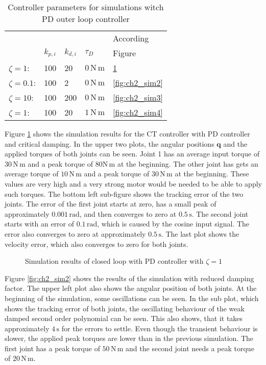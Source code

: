 \begin{table}[H]
	\begin{center}
		\caption{Controller parameters for simulations witch PD outer loop controller}
		\label{tab:ch2_pdparams}
		\begin{tabular}{lllll}
			 & & & & According \\
			 & $k_{p,i}$ & $k_{d,i}$ & $\tau_D$ & Figure \\
			\midrule
			$\zeta = 1$: & 100 & 20 & $0\,\mathrm{N\,m}$ & \ref{fig:ch2_sim1} \\
			$\zeta = 0.1$: & 100 & 2 & $0\,\mathrm{N\,m}$ & \ref{fig:ch2_sim2} \\
			$\zeta = 10$: & 100 & 200 & $0\,\mathrm{N\,m}$ & \ref{fig:ch2_sim3} \\
			$\zeta = 1$: & 100 & 20 & $1\,\mathrm{N\,m}$ & \ref{fig:ch2_sim4} \\
			\bottomrule
		\end{tabular}
	\end{center}
\end{table}
Figure \ref{fig:ch2_sim1} shows the simulation results for the \ac{CT} controller with PD controller and critical damping. In the upper two plots, the angular positions $\mathbf{q}$ and the applied torques of both joints can be seen. Joint 1 has an average input torque of $30\,\mathrm{N\,m}$ and a peak torque of $80\mathrm{N\,m}$ at the beginning. The other joint has gets an average torque of $10\,\mathrm{N\,m}$ and a peak torque of $30\,\mathrm{N\,m}$ at the beginning. These values are very high and a very strong motor would be needed to be able to apply such torques. The bottom left sub-figure shows the tracking error of the two joints. The error of the first joint starts at zero, has a small peak of approximately $0.001\,\mathrm{rad}$, and then converges to zero at $0.5\,\mathrm{s}$. The second joint starts with an error of $0.1\,\mathrm{rad}$, which is caused by the cosine input signal. The error also converges to zero at approximately $0.5\,\mathrm{s}$. The last plot shows the velocity error, which also converges to zero for both joints.
\begin{figure}[H]
	\centering
	
	\caption{Simulation results of closed loop with PD controller with $\zeta = 1$}
	\label{fig:ch2_sim1}
\end{figure}
Figure \ref{fig:ch2_sim2} shows the results of the simulation with reduced damping factor. The upper left plot also shows the angular position of both joints. At the beginning of the simulation, some oscillations can be seen. In the sub plot, which shows the tracking error of both joints, the oscillating behaviour of the weak damped second order polynomial can be seen. This also shows, that it takes approximately $4\,\mathrm{s}$ for the errors to settle. Even though the transient behaviour is slower, the applied peak torques are lower than in the previous simulation. The first joint has a peak torque of $50\,\mathrm{N\,m}$ and the second joint needs a peak torque of $20\,\mathrm{N\,m}$.
